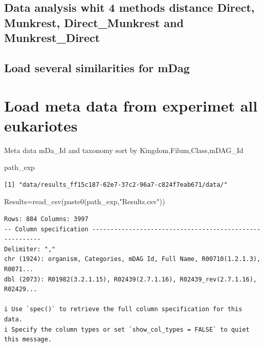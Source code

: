 \documentclass[
  letterpaper,
  DIV=11,
  numbers=noendperiod]{scrreprt}
\newenvironment{Shaded}{\begin{snugshade}}{\end{snugshade}}
\newcommand{\FunctionTok}[1]{\textcolor[rgb]{0.28,0.35,0.67}{#1}}
\newcommand{\NormalTok}[1]{\textcolor[rgb]{0.00,0.23,0.31}{#1}}
\newcommand{\OtherTok}[1]{\textcolor[rgb]{0.00,0.23,0.31}{#1}}
\newcommand{\StringTok}[1]{\textcolor[rgb]{0.13,0.47,0.30}{#1}}
\begin{document}
\hypertarget{data-analysis-whit-4-methods-distance-direct-munkrest-direct_munkrest-and-munkrest_direct}{%
\section{Data analysis whit 4 methods distance Direct, Munkrest,
Direct\_Munkrest and
Munkrest\_Direct}\label{data-analysis-whit-4-methods-distance-direct-munkrest-direct_munkrest-and-munkrest_direct}}

\hypertarget{load-several-similarities-for-mdag}{%
\section{Load several similarities for
mDag}\label{load-several-similarities-for-mdag}}


\hypertarget{load-meta-data-from-experimet-all-eukariotes}{%
\chapter{Load meta data from experimet all
eukariotes}\label{load-meta-data-from-experimet-all-eukariotes}}

Meta data mDa\_Id and taxonomy sort by Kingdom,Filum,Class,mDAG\_Id

\begin{Shaded}
\begin{Highlighting}[]
\NormalTok{path\_exp}
\end{Highlighting}
\end{Shaded}

\begin{verbatim}
[1] "data/results_ff15c187-62e7-37c2-96a7-c824f7eab671/data/"
\end{verbatim}

\begin{Shaded}
\begin{Highlighting}[]
\NormalTok{Results}\OtherTok{=}\FunctionTok{read\_csv}\NormalTok{(}\FunctionTok{paste0}\NormalTok{(path\_exp,}\StringTok{"Results.csv"}\NormalTok{))}
\end{Highlighting}
\end{Shaded}

\begin{verbatim}
Rows: 884 Columns: 3997
-- Column specification --------------------------------------------------------
Delimiter: ","
chr (1924): organism, Categories, mDAG Id, Full Name, R00710(1.2.1.3), R0071...
dbl (2073): R01982(3.2.1.15), R02439(2.7.1.16), R02439_rev(2.7.1.16), R02429...

i Use `spec()` to retrieve the full column specification for this data.
i Specify the column types or set `show_col_types = FALSE` to quiet this message.
\end{verbatim}
\end{document}
